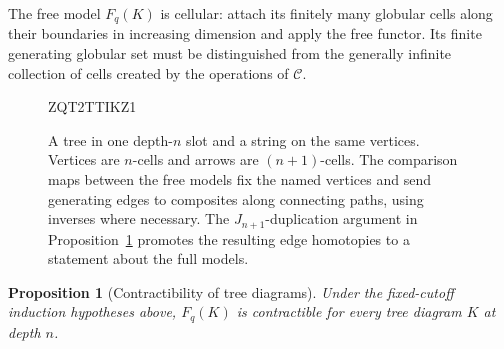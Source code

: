 \documentclass[11pt,letterpaper]{article}
\numberwithin{equation}{section}
\theoremstyle{plain}
\newtheorem{proposition}[theorem]{Proposition}
\theoremstyle{definition}
\theoremstyle{remark}
\begin{document}
The free model $F_q(K)$ is cellular: attach its finitely many
globular cells along their boundaries in increasing dimension and
apply the free functor.  Its finite generating globular set must
be distinguished from the generally infinite collection of cells
created by the operations of $\mathcal C$.

\begin{figure}

ZQT2TTIKZ1
\caption{A tree in one depth-\(n\) slot and a string on the same vertices.
Vertices are \(n\)-cells and arrows are
\((n+1)\)-cells.  The comparison maps between the free models fix the
named vertices and send generating edges to composites along connecting
paths, using inverses where necessary.  The \(J_{n+1}\)-duplication
argument in Proposition~\ref{prop:tree-contractible} promotes the
resulting edge homotopies to a statement about the full models.}
\label{fig:tree-string}
\end{figure}


\begin{proposition}[Contractibility of tree diagrams]
\label{prop:tree-contractible}
Under the fixed-cutoff induction hypotheses above, $F_q(K)$ is
contractible for every tree diagram $K$ at depth $n$.
\end{proposition}
\end{document}
